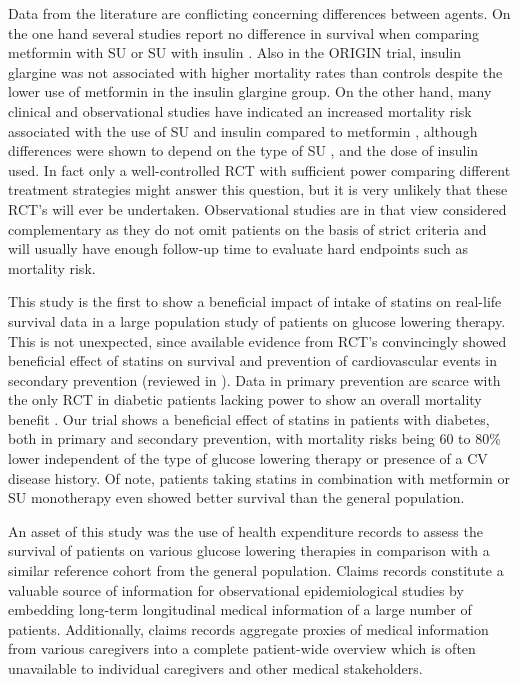 Data from the literature are conflicting concerning differences between agents. On the one hand several studies report no difference in survival when comparing metformin with SU \citep{s18,s19,s20} or SU with insulin \citep{s19}. Also in the ORIGIN trial, insulin glargine was not associated with higher mortality rates than controls \citep{s21} despite the lower use of metformin in the insulin glargine group. On the other hand, many clinical and observational studies have indicated an increased mortality risk associated with the use of SU and insulin compared to metformin \citep{s3,s4,s5,s6,s7,s8}, although differences were shown to depend on the type of SU \citep{s22,s23}, and the dose of insulin \citep{s24} used. In fact only a well-controlled RCT with sufficient power comparing different treatment strategies might answer this question, but it is very unlikely that these RCT's will ever be undertaken. Observational studies are in that view considered complementary as they do not omit patients on the basis of strict criteria and will usually have enough follow-up time to evaluate hard endpoints such as mortality risk. 

This study is the first to show a beneficial impact of intake of statins on real-life survival data in a large population study of patients on glucose lowering therapy. This is not unexpected, since available evidence from RCT's convincingly showed beneficial effect of statins on survival and prevention of cardiovascular events in secondary prevention (reviewed in \citep{s25}). Data in primary prevention are scarce with the only RCT in diabetic patients lacking power to show an overall mortality benefit \citep{s26}. Our trial shows a beneficial effect of statins in patients with diabetes, both in primary and secondary prevention, with mortality risks being 60 to 80\% lower independent of the type of glucose lowering therapy or presence of a CV disease history. Of note, patients taking statins in combination with metformin or SU monotherapy even showed better survival than the general population. 

An asset of this study was the use of health expenditure records to assess the survival of patients on various glucose lowering therapies in comparison with a similar reference cohort from the general population. Claims records constitute a valuable source of information for observational epidemiological studies by embedding long-term longitudinal medical information of a large number of patients. Additionally, claims records aggregate proxies of medical information from various caregivers into a complete patient-wide overview which is often unavailable to individual caregivers and other medical stakeholders. 

